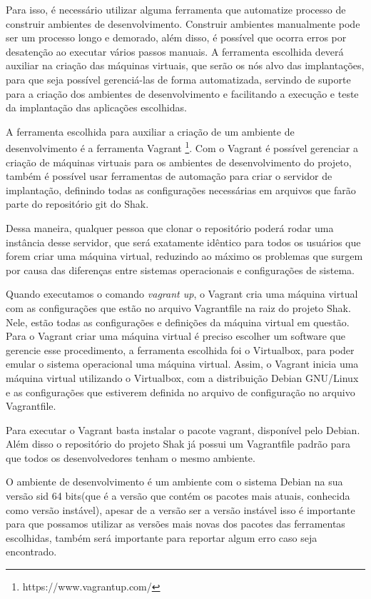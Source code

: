 Para isso, é necessário utilizar alguma ferramenta que automatize processo de 
construir ambientes de desenvolvimento. Construir ambientes manualmente pode
ser um processo longo e demorado, além disso, é possível que ocorra erros por
desatenção ao executar vários passos manuais. A ferramenta escolhida deverá auxiliar
 na criação das máquinas virtuais, que serão os nós alvo 
das implantações, para que seja possível gerenciá-las de forma automatizada, 
servindo de suporte para a criação dos ambientes de desenvolvimento e 
facilitando a execução e teste da implantação das aplicações escolhidas.

A ferramenta escolhida para auxiliar a criação de um ambiente de desenvolvimento é
a ferramenta Vagrant \footnote{https://www.vagrantup.com/}. Com o Vagrant é 
possível gerenciar a criação de máquinas
virtuais para os ambientes de desenvolvimento do projeto, também é possível usar
ferramentas de automação para criar o servidor de implantação, definindo todas
as configurações necessárias em arquivos que farão parte do repositório git do 
Shak. 

Dessa maneira, qualquer pessoa que clonar o repositório poderá rodar uma 
instância desse servidor, que será exatamente idêntico para todos os usuários 
que forem criar uma máquina virtual, reduzindo ao máximo os problemas que surgem 
por causa das diferenças entre sistemas operacionais e configurações de sistema.

Quando executamos o comando \textit{vagrant up}, o Vagrant cria uma máquina virtual com as
configurações que estão no arquivo Vagrantfile na raiz do projeto Shak. Nele,
estão todas as configurações e definições da máquina virtual em questão. Para o
Vagrant criar uma máquina virtual é preciso escolher um software que gerencie
esse procedimento, a ferramenta escolhida foi o Virtualbox, para poder emular o sistema
operacional uma máquina virtual. Assim, o Vagrant inicia uma máquina virtual
utilizando o Virtualbox, com a distribuição Debian GNU/Linux e as configurações que estiverem
definida no arquivo de configuração no arquivo Vagrantfile.

Para executar o Vagrant basta instalar o pacote vagrant, disponível pelo Debian. Além disso
o repositório do projeto Shak já possui um Vagrantfile padrão para que todos os
desenvolvedores tenham o mesmo ambiente. 

O ambiente de desenvolvimento é um ambiente com o sistema Debian na sua versão
sid 64 bits(que é a versão que contém os pacotes mais atuais, conhecida como versão instável),
apesar de a versão ser a versão instável isso é importante para que possamos
utilizar as versões mais novas dos pacotes das ferramentas escolhidas, também
será importante para reportar algum erro caso seja encontrado.

